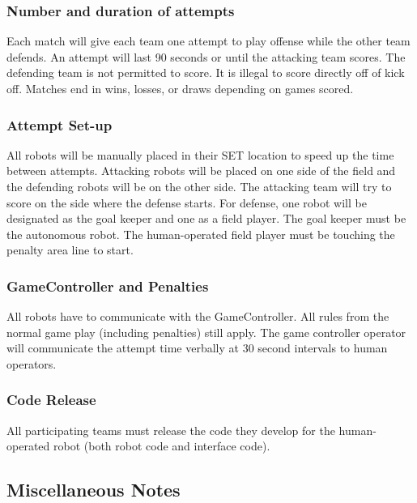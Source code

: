 \subsubsection{Number and duration of attempts}
Each match will give each team one attempt to play offense while the other team defends. An attempt will last 90 seconds or until the attacking team scores. The defending team is not permitted to score. It is illegal to score directly off of kick off. Matches end in wins, losses, or draws depending on games scored.

\subsubsection{Attempt Set-up}
All robots will be manually placed in their SET location to speed up the time between attempts.  Attacking robots will be placed on one side of the field and the defending robots will be on the other side. The attacking team will try to score on the side where the defense starts. For defense, one robot will be designated as the goal keeper and one as a field player. The goal keeper must be the autonomous robot. The human-operated field player must be touching the penalty area line to start.


\subsubsection{GameController and Penalties}
All robots have to communicate with the GameController. All rules from the normal game play (including penalties) still apply. The game controller operator will communicate the attempt time verbally at 30 second intervals to human operators.


\subsubsection{Code Release}
All participating teams must release the code they develop for the human-operated robot (both robot code and interface code).

\subsection{Miscellaneous Notes}

